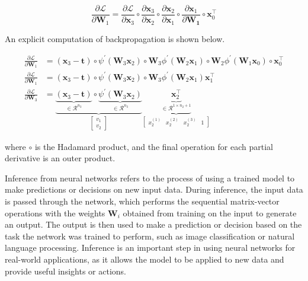\begin{equation}
    \frac{\partial \mathcal{L}}{\partial \boldsymbol{W}_1} = \frac{\partial \mathcal{L}}{\partial \boldsymbol{x}_3} \circ \frac{\partial \boldsymbol{x}_3}{\partial \boldsymbol{x}_2} \circ \frac{\partial \boldsymbol{x}_2}{\partial \boldsymbol{x}_1} \circ \frac{\partial \boldsymbol{x}_1}{\partial \boldsymbol{W_1}} \circ \boldsymbol{x}_0^\top
\end{equation}
 
 


\noindent An explicit computation of backpropagation is shown below. 

\begin{align}
    \frac{\partial \mathcal{L}}{\partial \boldsymbol{W}_1} &= (\boldsymbol{x}_3 - \boldsymbol{t}) \circ \psi^{\prime} (\boldsymbol{W}_3 \boldsymbol{x}_2) \circ \boldsymbol{W}_3 \phi^\prime (\boldsymbol{W}_2 \boldsymbol{x}_1) \circ \boldsymbol{W}_2 \phi^\prime(\boldsymbol{W}_1\boldsymbol{x}_0) \circ \boldsymbol{x}_0^\top \\
    \frac{\partial \mathcal{L}}{\partial \boldsymbol{W}_1} &= (\boldsymbol{x}_3 - \boldsymbol{t}) \circ \psi^\prime(\boldsymbol{W}_3 \boldsymbol{x}_2) \circ \boldsymbol{W}_3 \phi^\prime(\boldsymbol{W}_2 \boldsymbol{x}_1) \boldsymbol{x}_1^\top \\
    \frac{\partial \mathcal{L}}{\partial \boldsymbol{W}_3} &= \underbrace{\underbrace{(\boldsymbol{x}_3 - \boldsymbol{t})}_{\in \mathcal{R}^{n_3}} \circ \underbrace{\psi^\prime(\boldsymbol{W}_3 \boldsymbol{x}_2)}_{\in \mathcal{R}^{n_3}} }_{\begin{bmatrix} v_1 \\ v_2\end{bmatrix}} \underbrace{\underbrace{\boldsymbol{x}_2^\top}_{\in \mathcal{R}^{1 \times n_2 + 1}} }_{\begin{bmatrix} x_2^{(1)} & x_2^{(2)} & x_2^{(3)} & 1 \end{bmatrix}}
\end{align}

where $\circ$ is the Hadamard product, and the final operation for each partial derivative is an outer product. 
    

Inference from neural networks refers to the process of using a trained model to make predictions or decisions on new input data. During inference, the input data is passed through the network, which performs the sequential matrix-vector operations with the weights $\boldsymbol{W}_i$ obtained from training on the input to generate an output. The output is then used to make a prediction or decision based on the task the network was trained to perform, such as image classification or natural language processing. Inference is an important step in using neural networks for real-world applications, as it allows the model to be applied to new data and provide useful insights or actions.

